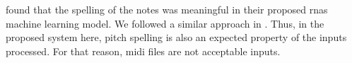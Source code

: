 

\textcite{micchi2020not} found that the spelling of the
notes was meaningful in their proposed \glspl{rna} machine
learning model. We followed a similar approach in
\textcite{napoleslopez2021augmentednet}. Thus, in the
proposed system here, pitch spelling is also an expected
property of the inputs processed. For that reason,
\gls{midi} files are not acceptable inputs.
